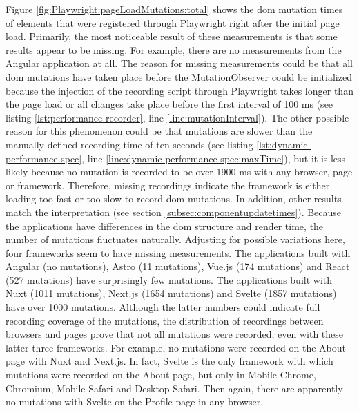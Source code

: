 \documentclass[a4paper, 12pt]{article}
\begin{document}
Figure \ref{fig:Playwright:pageLoadMutations:total} shows the \acrshort{dom} mutation times of elements that were registered through Playwright right after the initial page load.
Primarily, the most noticeable result of these measurements is that some results appear to be missing.
For example, there are no measurements from the Angular application at all.
The reason for missing measurements could be that all \acrshort{dom} mutations have taken place before the MutationObserver could be initialized because the injection of the recording script through Playwright takes longer than the page load or all changes take place before the first interval of 100 ms (see listing \ref{lst:performance-recorder}, line \ref{line:mutationInterval}).
The other possible reason for this phenomenon could be that mutations are slower than the manually defined recording time of ten seconds (see listing \ref{lst:dynamic-performance-spec}, line \ref{line:dynamic-performance-spec:maxTime}), but it is less likely because no mutation is recorded to be over 1900 ms with any browser, page or framework.
Therefore, missing recordings indicate the framework is either loading too fast or too slow to record \acrshort{dom} mutations.
In addition, other results match the interpretation (see section \ref{subsec:componentupdatetimes}).
Because the applications have differences in the \acrshort{dom} structure and render time, the number of mutations fluctuates naturally.
Adjusting for possible variations here, four frameworks seem to have missing measurements.
The applications built with Angular (no mutations), Astro (11 mutations), Vue.js (174 mutations) and React (527 mutations) have surprisingly few mutations.
The applications built with Nuxt (1011 mutations), Next.js (1654 mutations) and Svelte (1857 mutations) have over 1000 mutations.
Although the latter numbers could indicate full recording coverage of the mutations, the distribution of recordings between browsers and pages prove that not all mutations were recorded, even with these latter three frameworks.
For example, no mutations were recorded on the About page with Nuxt and Next.js.
In fact, Svelte is the only framework with which mutations were recorded on the About page, but only in Mobile Chrome, Chromium, Mobile Safari and Desktop Safari.
Then again, there are apparently no mutations with Svelte on the Profile page in any browser.
\end{document}
